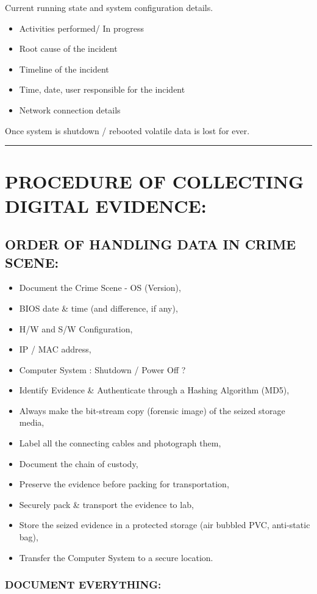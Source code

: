 \documentclass[10pt,british,english]{article}
\begin{document}
Current running state and system configuration details.
\begin{itemize}
\item Activities performed/ In progress
\item Root cause of the incident
\item Timeline of the incident
\item Time, date, user responsible for the incident
\item Network connection details
\end{itemize}
Once system is shutdown / rebooted volatile data is lost for ever. 

\rule[0.5ex]{1\columnwidth}{1pt}

\section{PROCEDURE OF COLLECTING DIGITAL EVIDENCE:}

\subsection{ORDER OF HANDLING DATA IN CRIME SCENE:}
\begin{itemize}
\item Document the Crime Scene - OS (Version),
\item BIOS date \& time (and difference, if any),
\item H/W and S/W Configuration,
\item IP / MAC address,
\item Computer System : Shutdown / Power Off ?
\item Identify Evidence \& Authenticate through a Hashing Algorithm (MD5),
\item Always make the bit-stream copy (forensic image) of the seized storage
media,
\item Label all the connecting cables and photograph them,
\item Document the chain of custody,
\item Preserve the evidence before packing for transportation,
\item Securely pack \& transport the evidence to lab,
\item Store the seized evidence in a protected storage (air bubbled PVC,
anti-static bag),
\item Transfer the Computer System to a secure location.
\end{itemize}

\subsubsection{DOCUMENT EVERYTHING:}
\end{document}
